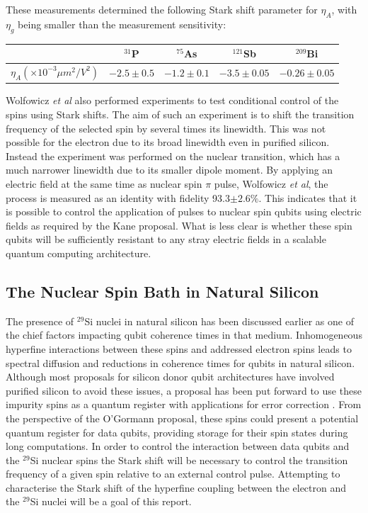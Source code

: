 These measurements determined the following Stark shift parameter for $\eta_A$, with $\eta_g$ being smaller than the measurement sensitivity:

\begin{center}
\begin{tabular}{||c || c | c | c | c||}
\hline
& $^{31}$P & $^{75}$As & $^{121}$Sb & $^{209}$Bi \\
\hline
$\eta_A (\times 10^{-3} \mu m^2 / V^2)$ & $-2.5\pm 0.5$ & $-1.2 \pm 0.1$ & $-3.5 \pm 0.05$ & $-0.26\pm0.05$\\
\hline
\end{tabular}
\end{center}

Wolfowicz \emph{et al} also performed experiments to test conditional control of the spins using Stark shifts.
The aim of such an experiment is to shift the transition frequency of the selected spin by several times its linewidth.
This was not possible for the electron due to its broad linewidth even in purified silicon.
Instead the experiment was performed on the nuclear transition, which has a much narrower linewidth due to its smaller dipole moment.
By applying an electric field at the same time as nuclear spin $\pi$ pulse, Wolfowicz \emph{et al}, the process is measured as an identity with fidelity 93.3$\pm2.6\%$.
This indicates that it is possible to control the application of pulses to nuclear spin qubits using electric fields as required by the Kane proposal.
What is less clear is whether these spin qubits will be sufficiently resistant to any stray electric fields in a scalable quantum computing architecture.

\subsection{The Nuclear Spin Bath in Natural Silicon}


The presence of $^{29}$Si nuclei in natural silicon has been discussed earlier as one of the chief factors impacting qubit coherence times in that medium.
Inhomogeneous hyperfine interactions between these spins and addressed electron spins leads to spectral diffusion and reductions in coherence times for qubits in natural silicon.
Although most proposals for silicon donor qubit architectures have involved purified silicon to avoid these issues, a proposal has been put forward to use these impurity spins as a quantum register with applications for error correction \cite{Wolfowicz2016a}.
From the perspective of the O'Gormann proposal, these spins could present a potential quantum register for data qubits, providing storage for their spin states during long computations.
In order to control the interaction between data qubits and the $^{29}$Si nuclear spins the Stark shift will be necessary to control the transition frequency of a given spin relative to an external control pulse.
Attempting to characterise the Stark shift of the hyperfine coupling between the electron and the $^{29}$Si nuclei will be a goal of this report.
